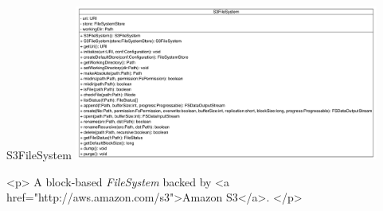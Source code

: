 \begin{XeClass}{S3FileSystem}
\includegraphics[width=10cm]{cdig/S3FileSystem.png}
     
 <p>
 A block-based \emph{FileSystem} backed by
 <a href="http://aws.amazon.com/s3">Amazon S3</a>.
 </p>


\end{XeClass}
